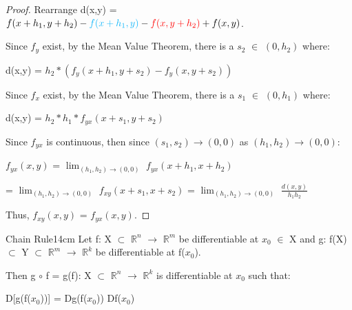 \begin{proof}
        Rearrange d(x,y) = $f(x+h_1,y+h_2) - {\color{lblue} f(x+h_1,y)}
                           - {\color{red} f(x,y+h_2)} + f(x,y)$.

        Since $f_y$ exist, by the Mean Value Theorem,
        there is a $s_2$ $\in$ $(0,h_2)$ where:

        \hspace{0.5cm}
        d(x,y) = $h_2 * (f_y(x+h_1,y+s_2) - f_y(x,y+s_2))$

        Since $f_x$ exist, by the Mean Value Theorem,
        there is a $s_1$ $\in$ $(0,h_1)$ where:

        \hspace{0.5cm}
        d(x,y) = $h_2 * h_1 * f_{yx}(x+s_1,y+s_2)$

        Since $f_{yx}$ is continuous, then since
        $(s_1,s_2) \rightarrow (0,0)$ as $(h_1,h_2) \rightarrow (0,0)$:

        \hspace{0.5cm}
        $f_{yx}(x,y)$
        = $\lim_{(h_1,h_2) \rightarrow (0,0)}$ $f_{yx}(x+h_1,x+h_2)$

        \hspace{2.15cm}
        = $\lim_{(h_1,h_2) \rightarrow (0,0)}$ $f_{xy}(x+s_1,x+s_2)$
        = $\lim_{(h_1,h_2) \rightarrow (0,0)}$ $\frac{d(x,y)}{h_1h_2}$

        Thus, $f_{xy}(x,y)$ = $f_{yx}(x,y)$.
    \end{proof}

    \vspace{0.5cm}



    \begin{wtheorem}{Chain Rule}{14cm}
        Let f: X $\subset$ $\mathbb{R}^n$ $\rightarrow$ $\mathbb{R}^m$
        be differentiable at $x_0$ $\in$ X and g: f(X) $\subset$ Y $\subset$
        $\mathbb{R}^m$ $\rightarrow$ $\mathbb{R}^k$ be differentiable at f($x_0$).
        
        Then g $\circ$ f = g(f): X $\subset$ $\mathbb{R}^n$ $\rightarrow$
        $\mathbb{R}^k$ is differentiable at $x_0$ such that:

        \hspace{0.5cm}
        D[g(f($x_0$))] = Dg(f($x_0$)) Df($x_0$) 
    \end{wtheorem}

